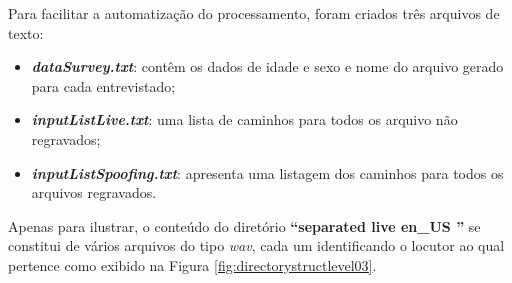 		\par Para facilitar a automatização do processamento, foram criados três arquivos de texto:
		\begin{itemize}
			\item \textit{\textbf{dataSurvey.txt}}: contêm os dados de idade e sexo e nome do arquivo gerado para cada entrevistado;
			\item \textit{\textbf{inputListLive.txt}}: uma lista de caminhos para todos os arquivo não regravados;
			\item \textit{\textbf{inputListSpoofing.txt}}: apresenta uma listagem dos caminhos para todos os arquivos regravados.
		\end{itemize}
	
		\par Apenas para ilustrar, o conteúdo do diretório \textbf{``separated \textfractionsolidus live \textfractionsolidus en\_US ''} se constitui de vários arquivos do tipo \textit{wav}, cada um identificando o locutor ao qual pertence como exibido na Figura \ref{fig:directorystructlevel03}.

